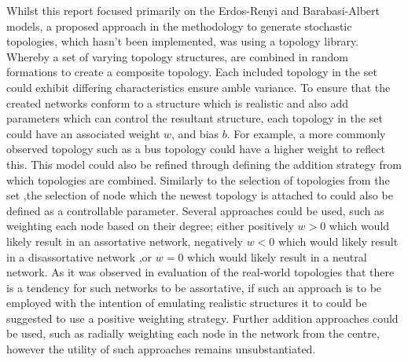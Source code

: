 Whilst this report focused primarily on the Erdos-Renyi and Barabasi-Albert models, a proposed approach in the methodology to generate stochastic topologies, which hasn't been implemented, was using a topology library. Whereby a set of varying topology structures, are combined in random formations to create a composite topology. Each included topology in the set could exhibit differing characteristics ensure amble variance. To ensure that the created networks conform to a structure which is realistic and also add parameters which can control the resultant structure, each topology in the set could have an associated weight $w$, and bias $b$. For example, a more commonly observed topology such as a bus topology could have a higher weight to reflect this. This model could also be refined through defining the addition strategy from which topologies are combined. Similarly to the selection of topologies from the set ,the selection of node which the newest topology is attached to could also be defined as a controllable parameter. Several approaches could be used, such as weighting each node based on their degree; either positively $w>0$ which would likely result in an assortative network, negatively $w<0$ which would likely result in a disassortative network ,or $w=0$ which would likely result in a neutral network. As it was observed in evaluation of the real-world topologies that there is a tendency for such networks to be assortative, if such an approach is to be employed with the intention of emulating realistic structures it to could be suggested to use a positive weighting strategy. Further addition approaches could be used, such as radially weighting each node in the network from the centre, however the utility of such approaches remains unsubstantiated. 






